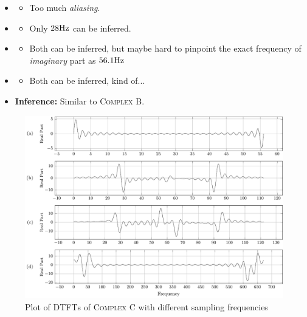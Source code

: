 \documentclass[../../course]{subfiles}
\begin{document}
\begin{itemize} [label=]

    \item \sampFreqMuchLess
        \begin{itemize} [label=]
            \item Too much \emph{aliasing}.
        \end{itemize}

    \item \sampFreqNorm
        \begin{itemize} [label=]
            \item Only $\freqXOne \si{Hz}$ can be inferred.
        \end{itemize}

    \item \sampFreqSligGreat
        \begin{itemize} [label=]
            \item Both can be inferred, but maybe hard to pinpoint the exact frequency of \emph{imaginary}
                part as $\freqXThree \si{Hz}$
        \end{itemize}

    \item \sampFreqMuchGreat
        \begin{itemize} [label=]
            \item Both can be inferred, kind of...
        \end{itemize}

    \item \textbf{Inference:} Similar to \textsc{Complex B}.

\end{itemize}

\vfill

\begin{figure} [H]
    \centering
     {
        \includegraphics[height = 0.8\textheight] {tikzpics/plotDtftComplexC32.pdf}
    }
     {Plot of \textsc{DTFT}s of \textsc{Complex C} with different sampling frequencies}
    \label{plt:dtftComplexC}
\end{figure}
\end{document}
